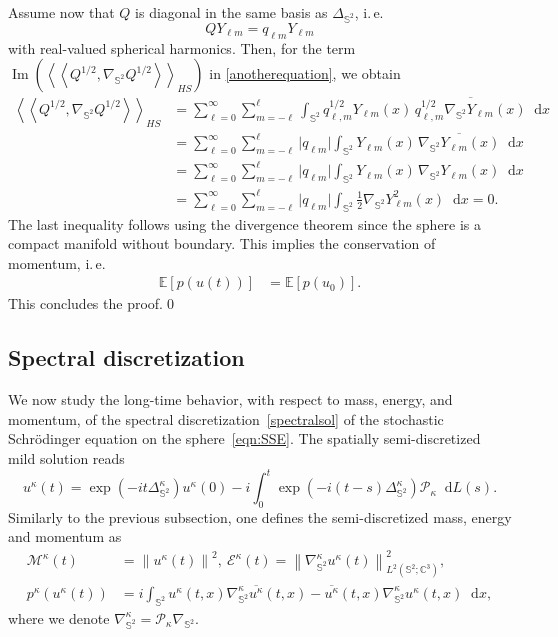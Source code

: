 \documentclass[11pt]{amsart}
\newcommand{\IC}{\mathbb{C}}
\newcommand{\E}{{\mathbb E}}
\newcommand{\IS}{\mathbb{S}}
\newcommand{\cE}{\mathcal E}
\newcommand{\cM}{\mathcal M}
\newcommand{\abs}[1]{\lvert #1 \rvert}
\providecommand{\norm}[1]{\left\lVert#1\right\rVert}
\newcommand*\dd{\mathop{}\!\mathrm{d}}
\newcommand{\expp}[1]{\exp\left(#1\right)}
\newcommand{\Deltalb}{\Delta_{\IS^2}}
\newcommand{\nablalb}{\nabla_{\IS^{2}}}
\newcommand{\cP}{\mathcal{P}}
\begin{document}
\begin{appendixproof}
\begin{enumerate}[label=\roman*)]
Assume now that \(Q\) is diagonal in the same basis as $\Deltalb$, i.\,e.
\[
Q Y_{\ell m} = q_{\ell m} Y_{\ell m}
\]
with real-valued spherical harmonics. Then, for the term $\operatorname{Im}\left(\left<\left<Q^{1/2},\nablalb Q^{1/2}\right>\right>_{HS}\right)$ in \eqref{anotherequation},
we obtain
\begin{align*}\label{diag_im}
	\left<\left<Q^{1/2},\nablalb Q^{1/2}\right>\right>_{HS}&=  \sum_{\ell=0}^\infty \sum_{m=-\ell}^\ell  \int_{\mathbb S^2} q_{\ell,m}^{1/2}Y_{\ell m}(x) \, \overline{q_{\ell,m}^{1/2}\nablalb Y_{\ell m}(x)} \dd x\\
	&=\sum_{\ell=0}^\infty \sum_{m=-\ell}^\ell \abs{q_{\ell m}} \int_{\mathbb S^2} Y_{\ell m}(x) \, \overline{\nablalb Y_{\ell m}(x)} \dd x \\
	&=\sum_{\ell=0}^\infty \sum_{m=-\ell}^\ell \abs{q_{\ell m}} \int_{\mathbb S^2} Y_{\ell m}(x) \,{\nablalb Y_{\ell m}(x)} \dd x \\
	&=\sum_{\ell=0}^\infty \sum_{m=-\ell}^\ell \abs{q_{\ell m}} \int_{\mathbb S^2} {\frac 12\nablalb Y^2_{\ell m}(x)} \dd x=0.
\end{align*}
The last inequality follows using the divergence theorem since the sphere is a compact manifold without boundary.
This implies the conservation of momentum, i.\,e.
\begin{align*}
	\E\left[p(u(t))\right]
	&= \E\left[ p(u_0)\right].
\end{align*}
This concludes the proof.\qed 
\end{enumerate}
\renewcommand{\qedsymbol}{}
\end{appendixproof}

\subsection{Spectral discretization}\label{sch-spectral}
We now study the long-time behavior, with respect to mass, energy, and momentum, of the spectral discretization~\eqref{spectralsol} of
the stochastic Schrödinger equation on the sphere~\eqref{eqn:SSE}. 
The spatially semi-discretized mild solution reads
\begin{equation}
    \label{eqn:SSE_spectral}
    u^\kappa(t) = \expp{-it\Deltalb^\kappa}u^\kappa(0) - i\int_{0}^{t} \expp{-i(t-s)\Deltalb^\kappa} \cP_\kappa \dd L(s).
\end{equation}
Similarly to the previous subsection, one defines the semi-discretized mass, energy and momentum as
\begin{align*}
    \cM^\kappa(t) &= \norm{u^\kappa(t)}^2,\ \cE^\kappa(t) = \norm{\nablalb^\kappa u^\kappa(t)}_{L^2(\IS^2; \IC^3)}^2,\  \\
    p^\kappa(u^\kappa(t)) &= i\int_{\IS^2} u^\kappa(t,x)\nablalb^\kappa \overline{u^\kappa}(t,x) - \overline{u^\kappa}(t,x)\nablalb^\kappa u^\kappa(t,x) \dd x,
\end{align*}
where we denote $\nablalb^\kappa = \mathcal P_\kappa \nablalb$.
\end{document}
